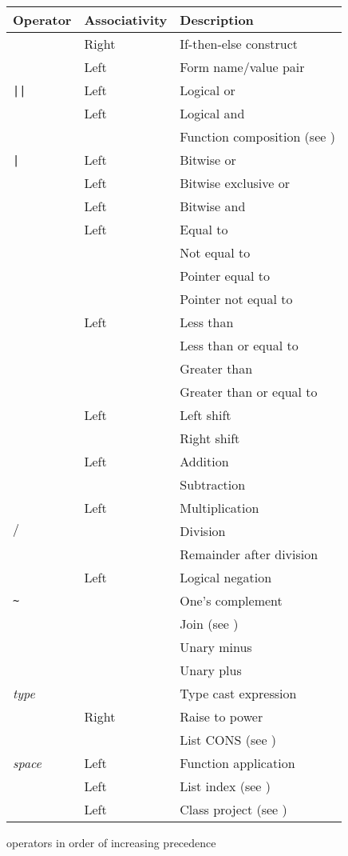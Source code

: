 \begin{tab2}
\begin{center}
\begin{tabular}{||l|l|l||}
\hline
Operator & Associativity & Description \\
\hline
\ct{if then else}	& Right			& If-then-else construct \\
\ct{=>}			& Left			& Form name/value pair \\
\verb+||+		& Left			& Logical or \\
\ct{\&\&}		& Left			& Logical and \\
\ct{@}			& 			& Function composition 
						  (see \pref{sec:func}) \\
\verb+|+		& Left			& Bitwise or \\
\rtp{}			& Left			& Bitwise exclusive or \\
\ct{\&}			& Left			& Bitwise and \\
\hline
\ct{==}			& Left			& Equal to\\
\ct{!=}			& 			& Not equal to\\
\ct{===}		& 			& Pointer equal to\\
\ct{!==}		& 			& Pointer not equal to\\
\hline
\ct{<}			& Left			& Less than \\
\ct{<=}			& 			& Less than or equal to\\
\ct{>}			& 			& Greater than \\
\ct{>=}			& 			& Greater than or equal to\\
\hline
\ct{<<}			& Left			& Left shift \\
\ct{>>}			& 			& Right shift \\
\hline
\ct{+}			& Left			& Addition \\
\ct{-}			& 			& Subtraction \\
\ct{*}			& Left			& Multiplication \\
$/$			& 			& Division \\
\ct{\%}			& 			& Remainder after division \\
\ct{!}			& Left			& Logical negation \\
\verb+~+		& 			& One's complement \\
\ct{++}			& 			& Join (see \pref{sec:lists}) \\
\ct{--}			& 			& Unary minus \\
\ct{+}			& 			& Unary plus \\
\ct{(}\emph{type}\ct{)}	& 			& Type cast expression \\
\ct{**}			& Right			& Raise to power \\
\ct{:}			& 			& List CONS
						  (see \pref{sec:lists}) \\
\emph{space}		& Left			& Function application \\
\ct{?}			& Left			& List index 
						  (see \pref{sec:lists}) \\
\ct{.}			& Left			& Class project 
						  (see \pref{sec:class}) \\
\hline
\end{tabular}
\end{center}
\caption{\nip{} operators in order of increasing precedence}
\end{tab2}

